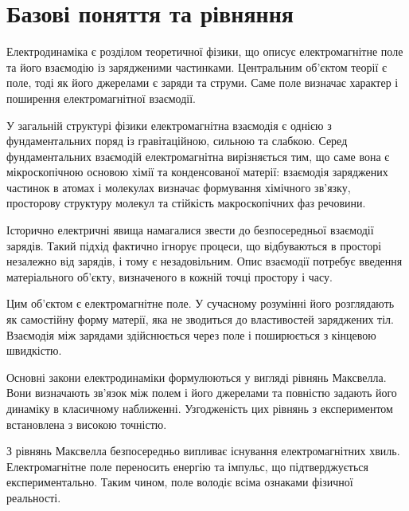 


\chapter{Базові поняття та рівняння}\label{\currfilebase}

Електродинаміка є розділом теоретичної фізики, що описує електромагнітне поле та його взаємодію із зарядженими
частинками. Центральним об'єктом теорії є поле, тоді як його джерелами є заряди та струми. Саме поле визначає характер і
поширення електромагнітної взаємодії.

У загальній структурі фізики електромагнітна взаємодія є однією з фундаментальних поряд із гравітаційною, сильною та
слабкою. Серед фундаментальних взаємодій електромагнітна вирізняється тим, що саме вона є мікроскопічною основою хімії
та конденсованої матерії: взаємодія заряджених частинок в атомах і молекулах визначає формування хімічного зв'язку,
просторову структуру молекул та стійкість макроскопічних фаз речовини.

Історично електричні явища намагалися звести до безпосередньої взаємодії зарядів. Такий підхід фактично ігнорує процеси,
що відбуваються в просторі незалежно від зарядів, і тому є незадовільним. Опис взаємодії потребує введення матеріального об'єкту, визначеного
в кожній точці простору і часу.

Цим об'єктом є електромагнітне поле. У сучасному розумінні його розглядають як самостійну форму матерії, яка не
зводиться до властивостей заряджених тіл. Взаємодія між зарядами здійснюється через поле і поширюється з кінцевою
швидкістю.

Основні закони електродинаміки формулюються у вигляді рівнянь Максвелла. Вони визначають зв'язок між полем і його джерелами та повністю задають його динаміку в класичному наближенні. Узгодженість цих рівнянь з експериментом встановлена з високою точністю.

З рівнянь Максвелла безпосередньо випливає існування електромагнітних хвиль. Електромагнітне поле переносить енергію та
імпульс, що підтверджується експериментально. Таким чином, поле володіє всіма ознаками фізичної реальності.

